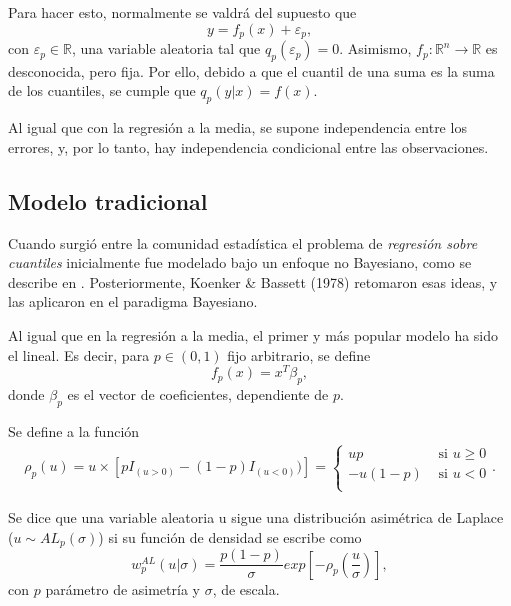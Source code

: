 Para hacer esto, normalmente se valdr\'a del supuesto que
\begin{equation*}
    y = f_p(x) + \varepsilon_p,
\end{equation*}
con $\varepsilon_p \in \mathbb{R}$, una variable aleatoria tal que $q_p(\varepsilon_p) = 0$. Asimismo, $f_p: \mathbb{R}^n \rightarrow \mathbb{R}$ es desconocida, pero fija. Por ello, debido a que el cuantil de una suma es la suma de los cuantiles, se cumple que $q_p(y|x) = f(x)$.

Al igual que con la regresi\'on a la media, se supone independencia entre los errores, y, por lo tanto, hay independencia condicional entre las observaciones.

\subsection{Modelo tradicional}

Cuando surgi\'o entre la comunidad estad\'istica el problema de \textit{regresi\'on sobre cuantiles} inicialmente fue modelado bajo un enfoque no Bayesiano, como se describe en \cite{Yu_BayQuantReg}.  Posteriormente, Koenker \& Bassett (1978) retomaron esas ideas, y las aplicaron en el paradigma Bayesiano. 

Al igual que en la regresi\'on a la media, el primer y m\'as popular modelo ha sido el lineal. Es decir, para $p \in (0,1)$ fijo arbitrario, se define
\begin{equation*}
    f_p(x) = x^T\beta_p, 
\end{equation*}
donde $\beta_p$ es el vector de coeficientes, dependiente de $p$.

\begin{defin}
    Se define a la funci\'on
    \begin{equation*}
    \begin{aligned}
        \rho_p(u) = u \times [pI_{(u>0)} - (1-p) I_{(u<0)})]
        =
        \begin{cases}
            up &\text{ si } u\geq0 \\
            -u(1-p) &\text{ si } u<0 \\
        \end{cases}
        .
    \end{aligned}
    \end{equation*}

    Se dice que una variable aleatoria u sigue una distribuci\'on asim\'etrica de Laplace ($u \sim AL_p(\sigma)$) si su funci\'on de densidad se escribe como
    \begin{equation*}
        w_p^{AL}(u|\sigma) = 
        \frac{p(1-p)}{\sigma}
        exp\left[
        -\rho_p
        \left(
        \frac{u}{\sigma}
        \right)
        \right],
    \end{equation*}
con $p$ par\'ametro de asimetr\'ia y $\sigma$, de escala.
\end{defin}

